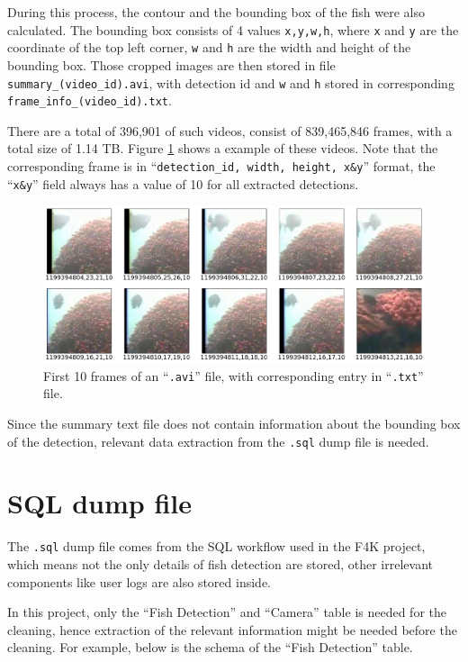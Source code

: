 \documentclass[bsc,logo,twoside,fullspacing,parskip]{infthesis}
\begin{document}
During this process, the contour and the bounding box of the fish were also calculated.
The bounding box consists of 4 values {\tt x,y,w,h}, where {\tt x} and {\tt y} are the coordinate of the top left corner, {\tt w} and {\tt h} are the width and height of the bounding box. 
Those cropped images are then stored in file {\tt summary\_(video\_id).avi}, with detection id and {\tt w} and {\tt h} stored in corresponding {\tt frame\_info\_(video\_id).txt}.

There are a total of 396,901 of such videos, consist of 839,465,846 frames, with a total size of 1.14 TB. 
Figure \ref{fig:summryfile} shows a example of these videos. 
Note that the corresponding frame is in ``{\tt detection\_id, width, height, x\&y}'' format, the ``{\tt x\&y}'' field always has a value of 10 for all extracted detections.

\begin{figure}[h]
    \centering
    \includegraphics[scale=0.35]{graph/summaryfile.png}
    \caption{First 10 frames of an ``{\tt .avi}'' file, with corresponding entry in ``{\tt .txt}'' file.}
    \label{fig:summryfile}
\end{figure}

Since the summary text file does not contain information about the bounding box of the detection, relevant data extraction from the {\tt .sql} dump file is needed.

\section{SQL dump file}
\label{sec:sqld}

The {\tt .sql} dump file comes from the SQL workflow used in the F4K project, which means not the only details of fish detection are stored, other irrelevant components like user logs are also stored inside. 

In this project, only the ``Fish Detection'' and ``Camera'' table is needed for the cleaning, hence extraction of the relevant information might be needed before the cleaning.
For example, below is the schema of the ``Fish Detection'' table. 
\end{document}
